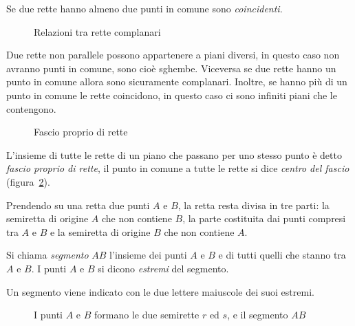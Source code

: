 \begin{definizione}
Se due rette hanno almeno due punti in comune sono \emph{coincidenti}.
\end{definizione}


\begin{inaccessibleblock}
 \begin{figure}[hbt]
 \centering 
 \caption{Relazioni tra rette complanari}\label{fig:1.12}
\end{figure}
\end{inaccessibleblock}

\osservazione Due rette non parallele possono appartenere a piani 
diversi, in questo caso non avranno punti in comune, sono cioè 
sghembe. Viceversa se due rette hanno un punto in comune allora sono 
sicuramente complanari. Inoltre, se hanno più di un punto in comune 
le rette coincidono, in questo caso ci sono infiniti piani che le 
contengono. 


\begin{inaccessibleblock}
 \begin{figure}[!htb]
	\centering
	\caption{Fascio proprio di rette}\label{fig:1.16}
\end{figure}
\end{inaccessibleblock}

\begin{definizione}
L'insieme di tutte le rette di un piano che passano per uno stesso 
punto è detto \emph{fascio proprio di rette}, il punto in comune a 
tutte le rette si dice \emph{centro del fascio} 
(figura~\ref{fig:1.16}).
\end{definizione}

Prendendo su una retta due punti $A$ e $B$, la retta resta divisa in 
tre parti: la semiretta di origine $A$ che non contiene $B$, la parte 
costituita dai punti compresi tra $A$ e $B$ e la semiretta di origine 
$B$ che non contiene $A$.

\begin{definizione}
Si chiama \emph{segmento} $AB$ l'insieme dei punti $A$ e $B$ e di 
tutti quelli che stanno tra $A$ e $B$.
I punti $A$ e $B$ si dicono \emph{estremi} del segmento.
\end{definizione}
Un segmento viene indicato con le due lettere maiuscole dei suoi 
estremi.

\begin{inaccessibleblock}
 \begin{figure}[bth]
 \centering 
 \caption{I punti $A$ e $B$ formano le due semirette $r$ ed $s$, e il 
segmento $AB$}\label{fig:1.13}
\end{figure}
\end{inaccessibleblock}

